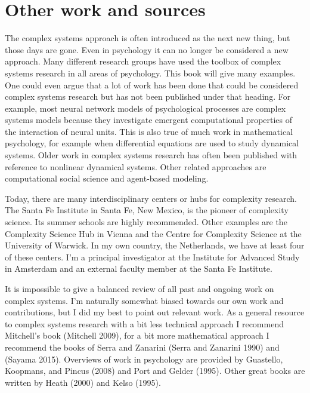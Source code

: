 \documentclass[
  a4paper,
  DIV=11,
  numbers=noendperiod,
  oneside]{scrreprt}
\begin{document}
\hypertarget{sec-Other-work-and-sources}{%
\section{Other work and sources}\label{sec-Other-work-and-sources}}

The complex systems approach is often introduced as the next new thing,
but those days are gone. Even in psychology it can no longer be
considered a new approach. Many different research groups have used the
toolbox of complex systems research in all areas of psychology. This
book will give many examples. One could even argue that a lot of work
has been done that could be considered complex systems research but has
not been published under that heading. For example, most neural network
models of psychological processes are complex systems models because
they investigate emergent computational properties of the interaction of
neural units. This is also true of much work in mathematical psychology,
for example when differential equations are used to study dynamical
systems. Older work in complex systems research has often been published
with reference to nonlinear dynamical systems. Other related approaches
are computational social science and agent-based modeling.

Today, there are many interdisciplinary centers or hubs for complexity
research. The Santa Fe Institute in Santa Fe, New Mexico, is the pioneer
of complexity science. Its summer schools are highly recommended. Other
examples are the Complexity Science Hub in Vienna and the Centre for
Complexity Science at the University of Warwick. In my own country, the
Netherlands, we have at least four of these centers. I'm a principal
investigator at the Institute for Advanced Study in Amsterdam and an
external faculty member at the Santa Fe Institute.

It is impossible to give a balanced review of all past and ongoing work
on complex systems. I'm naturally somewhat biased towards our own work
and contributions, but I did my best to point out relevant work. As a
general resource to complex systems research with a bit less technical
approach I recommend Mitchell's book (Mitchell 2009), for a bit more
mathematical approach I recommend the books of Serra and Zanarini (Serra
and Zanarini 1990) and (Sayama 2015). Overviews of work in psychology
are provided by Guastello, Koopmans, and Pincus (2008) and Port and
Gelder (1995). Other great books are written by Heath (2000) and Kelso
(1995).
\end{document}
